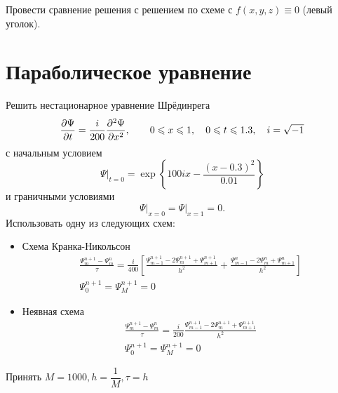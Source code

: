 \documentclass[10pt]{article}
\begin{document}
Провести сравнение решения с решением по схеме с $f(x,y,z) \equiv 0$ (левый уголок).

\section{Параболическое уравнение}
Решить нестационарное уравнение Шрёдинрега
\[
\frac{\partial \Psi}{\partial t} = \frac{i}{200} \frac{\partial {}^2\Psi}{\partial x^2}, \qquad 0 \leqslant x \leqslant
1,\quad 0 \leqslant t \leqslant 1.3, \quad i = \sqrt{-1}
\]
с начальным условием
\[
\Psi\big|_{t = 0} = \exp\left\{100ix - \frac{(x-0.3)^2}{0.01}\right\}
\]
и граничными условиями
\[
\Psi\big|_{x=0} = \Psi\big|_{x=1} = 0.
\]
Использовать одну из следующих схем:
\begin{itemize}
\item Схема Кранка-Никольсон
\begin{gather*}
\frac{\Psi^{n+1}_m - \Psi^{n}_m}{\tau} = \frac{i}{400}
\left[
\frac{\Psi^{n+1}_{m-1} -2\Psi^{n+1}_m + \Psi^{n+1}_{m+1}}{h^2} + 
\frac{\Psi^n_{m-1} -2\Psi^n_m + \Psi^n_{m+1}}{h^2}\right]\\
\Psi^{n+1}_0 = \Psi^{n+1}_M = 0
\end{gather*}
\item Неявная схема
\begin{gather*}
\frac{\Psi^{n+1}_m - \Psi^{n}_m}{\tau} = \frac{i}{200}
\frac{\Psi^{n+1}_{m-1} -2\Psi^{n+1}_m + \Psi^{n+1}_{m+1}}{h^2}\\
\Psi^{n+1}_0 = \Psi^{n+1}_M = 0
\end{gather*}
\end{itemize}
Принять $M = 1000, h = \dfrac{1}{M}, \tau = h$
\end{document}
